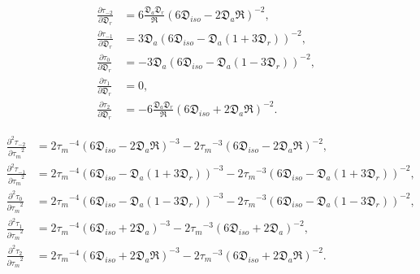 \documentclass[a4paper,11pt,twoside,openright]{book}
\def\lthtmlcheckvsize{\ifdim\ht\sizebox<\vsize 
  \ifdim\wd\sizebox<\hsize\expandafter\hfill\fi \expandafter\vfill
  \else\expandafter\vss\fi}%
\begin{document}
{\newpage\clearpage
\setcounter{equation}{139}
%
\begin{subequations}\begin{align}
\frac{\partial \tau_{-2}}{\partial \mathfrak{D}_r} &= 6\frac{\mathfrak{D}_a \mathfrak{D}_r}{\mathfrak{R}} (6\mathfrak{D}_{iso} - 2\mathfrak{D}_a\mathfrak{R})^{-2}, \\
\frac{\partial \tau_{-1}}{\partial \mathfrak{D}_r} &= 3\mathfrak{D}_a (6\mathfrak{D}_{iso} - \mathfrak{D}_a (1 + 3\mathfrak{D}_r))^{-2}, \\
\frac{\partial \tau_{0}}{\partial \mathfrak{D}_r}  &= -3\mathfrak{D}_a (6\mathfrak{D}_{iso} - \mathfrak{D}_a (1 - 3\mathfrak{D}_r))^{-2}, \\
\frac{\partial \tau_{1}}{\partial \mathfrak{D}_r}  &= 0, \\
\frac{\partial \tau_{2}}{\partial \mathfrak{D}_r}  &= -6\frac{\mathfrak{D}_a \mathfrak{D}_r}{\mathfrak{R}} (6\mathfrak{D}_{iso} + 2\mathfrak{D}_a\mathfrak{R})^{-2}.
\end{align}\end{subequations}%
\lthtmldisplayZ
\lthtmlcheckvsize\clearpage}

{\newpage\clearpage
\setcounter{equation}{140}
%
\begin{subequations}\begin{align}
\frac{\partial^2 \tau_{-2}}{{\partial \tau_m}^2} &= 2{\tau_m}^{-4} (6\mathfrak{D}_{iso} - 2\mathfrak{D}_a\mathfrak{R})^{-3}
- 2{\tau_m}^{-3} (6\mathfrak{D}_{iso} - 2\mathfrak{D}_a\mathfrak{R})^{-2}, \\
\frac{\partial^2 \tau_{-1}}{{\partial \tau_m}^2} &= 2{\tau_m}^{-4} (6\mathfrak{D}_{iso} - \mathfrak{D}_a (1 + 3\mathfrak{D}_r))^{-3}
- 2{\tau_m}^{-3} (6\mathfrak{D}_{iso} - \mathfrak{D}_a (1 + 3\mathfrak{D}_r))^{-2}, \\
\frac{\partial^2 \tau_{0}}{{\partial \tau_m}^2}  &= 2{\tau_m}^{-4} (6\mathfrak{D}_{iso} - \mathfrak{D}_a (1 - 3\mathfrak{D}_r))^{-3}
- 2{\tau_m}^{-3} (6\mathfrak{D}_{iso} - \mathfrak{D}_a (1 - 3\mathfrak{D}_r))^{-2}, \\
\frac{\partial^2 \tau_{1}}{{\partial \tau_m}^2}  &= 2{\tau_m}^{-4} (6\mathfrak{D}_{iso} + 2\mathfrak{D}_a)^{-3}
- 2{\tau_m}^{-3} (6\mathfrak{D}_{iso} + 2\mathfrak{D}_a)^{-2}, \\
\frac{\partial^2 \tau_{2}}{{\partial \tau_m}^2}  &= 2{\tau_m}^{-4} (6\mathfrak{D}_{iso} + 2\mathfrak{D}_a\mathfrak{R})^{-3}
- 2{\tau_m}^{-3} (6\mathfrak{D}_{iso} + 2\mathfrak{D}_a\mathfrak{R})^{-2}.
\end{align}\end{subequations}%
\lthtmldisplayZ
\lthtmlcheckvsize\clearpage}
\end{document}
